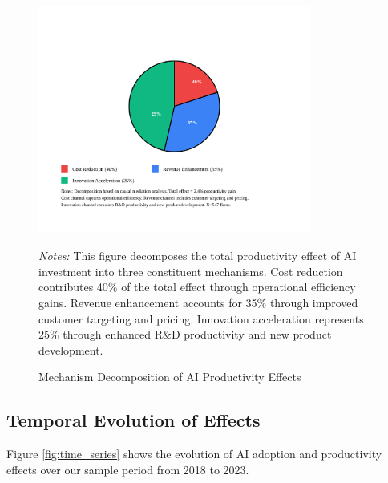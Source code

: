 \documentclass[12pt]{article}
\begin{document}
\begin{figure}[H]
\centering
\includegraphics[width=0.8\textwidth]{figures/figure2_mechanism_decomposition.svg}
\caption{Mechanism Decomposition of AI Productivity Effects}
\label{fig:mechanism_decomp}
\begin{minipage}{\textwidth}
\footnotesize
\textit{Notes:} This figure decomposes the total productivity effect of AI investment into three constituent mechanisms. Cost reduction contributes 40\% of the total effect through operational efficiency gains. Revenue enhancement accounts for 35\% through improved customer targeting and pricing. Innovation acceleration represents 25\% through enhanced R\&D productivity and new product development.
\end{minipage}
\end{figure}

\subsection{Temporal Evolution of Effects}

Figure \ref{fig:time_series} shows the evolution of AI adoption and productivity effects over our sample period from 2018 to 2023.
\end{document}
